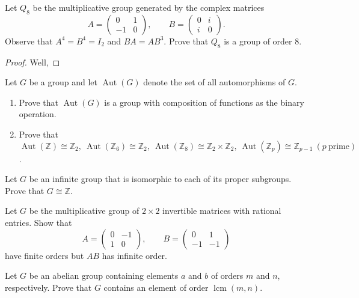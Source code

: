\documentclass[addpoints,10pt]{exam}
\theoremstyle{plain}
\theoremstyle{definition}
\newtheorem{prob}[thm]{Problem}
\theoremstyle{plain}
\theoremstyle{plain}
\theoremstyle{definition}
\let\oldprob\prob
\let\endoldprob\endprob
\renewenvironment{prob}
  {\begin{singlespace}\oldprob}
  {\endoldprob\end{singlespace}}
\begin{document}
\begin{prob}
  Let $Q_8$ be the multiplicative group generated by the complex matrices
  \[
  A=\begin{pmatrix}0 & 1 \\ -1 & 0\end{pmatrix},
  \qquad
  B=\begin{pmatrix}0 & i \\ i & 0\end{pmatrix}.
  \]
  Observe that $A^4=B^4=I_2$ and $BA=AB^3$. Prove that $Q_8$ is a group of order $8$.
\end{prob}

\begin{proof}
Well, 
\end{proof}

\begin{prob}
  Let $G$ be a group and let $\operatorname{Aut}(G)$ denote the set of all automorphisms of $G$.
  \begin{enumerate}[label=(\alph*)]
  \item Prove that $\operatorname{Aut}(G)$ is a group with composition of functions as the binary operation.
  \item Prove that $\operatorname{Aut}(\mathbb{Z}) \cong \mathbb{Z}_2,\ 
  \operatorname{Aut}(\mathbb{Z}_6)\cong \mathbb{Z}_2,\
  \operatorname{Aut}(\mathbb{Z}_8)\cong \mathbb{Z}_2 \times \mathbb{Z}_2,\
  \operatorname{Aut}(\mathbb{Z}_p)\cong \mathbb{Z}_{p-1}\ (p\ \text{prime})$.
\end{enumerate}
\end{prob}

\begin{prob}
  Let $G$ be an infinite group that is isomorphic to each of its proper subgroups. Prove that $G \cong \mathbb{Z}$.
\end{prob}

\begin{prob}
  Let $G$ be the multiplicative group of $2\times 2$ invertible matrices with rational entries. Show that
  \[
  A=\begin{pmatrix}0 & -1 \\ 1 & 0\end{pmatrix},
  \qquad
  B=\begin{pmatrix}0 & 1 \\ -1 & -1\end{pmatrix}
  \]
  have finite orders but $AB$ has infinite order.
\end{prob}

\begin{prob}
  Let $G$ be an abelian group containing elements $a$ and $b$ of orders $m$ and $n$, respectively. Prove that $G$ contains an element of order $\operatorname{lcm}(m,n)$.
\end{prob}
\end{document}
